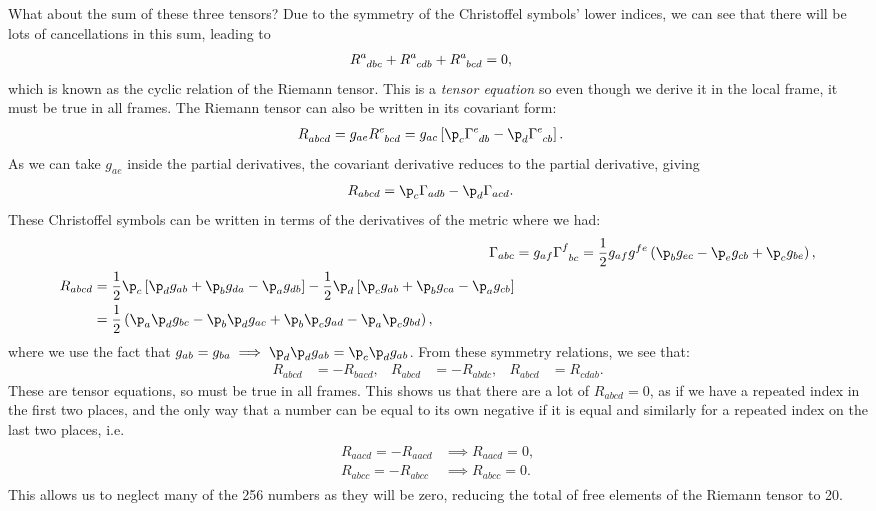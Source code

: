 \documentclass[a4paper, 11pt, normalem]{report}
\begin{document}
What about the sum of these three tensors?
Due to the symmetry of the Christoffel symbols' lower indices, we can see that there will be lots of cancellations in this sum, leading to
\begin{align}
    \tensor{R}{^a_{dbc}} + \tensor{R}{^a_{cdb}} + \tensor{R}{^a_{bcd}} &= 0,
\end{align}
which is known as the cyclic relation of the Riemann tensor.
This is a \emph{tensor equation} so even though we derive it in the local frame, it must be true in all frames. 
The Riemann tensor can also be written in its covariant form:
\begin{align}
    \tensor{R}{_{abcd}} &= g_{ae}\tensor{R}{^e_{bcd}} = g_{ac}\left[\p_c\tensor{\Gamma}{^e_{db}} - \p_d\tensor{\Gamma}{^e_{cb}}\right].
\end{align}
As we can take $g_{ae}$ inside the partial derivatives, the covariant derivative reduces to the partial derivative, giving
\begin{align}
    R_{abcd} &= \p_c\Gamma_{adb}-\p_d\Gamma_{acd}.
\end{align}
These Christoffel symbols can be written in terms of the derivatives of the metric where we had:
\begin{align}
    \Gamma_{abc} &= g_{af}\tensor{\Gamma}{^f_{bc}} = \frac12 g_{af}g^{fe}\left(\p_bg_{ec} - \p_eg_{cb} + \p_cg_{be}\right),\\
    \begin{split}
        R_{abcd} &= \frac12\p_c\left[\p_dg_{ab} + \p_bg_{da} - \p_ag_{db}\right] - \frac12\p_d\left[\p_cg_{ab} + \p_bg_{ca} - \p_ag_{cb}\right] \\
                 &= \frac12\left(\p_a\p_dg_{bc} - \p_b\p_dg_{ac} + \p_b\p_cg_{ad} - \p_a\p_cg_{bd}\right),
    \end{split}
\end{align}
where we use the fact that $g_{ab}=g_{ba} \implies \p_d\p_dg_{ab} = \p_c\p_dg_{ab}$.
From these symmetry relations, we see that:
\begin{align}
    R_{abcd} &= -R_{bacd}, & R_{abcd} &= -R_{abdc}, & R_{abcd} &= R_{cdab}.
\end{align}
These are tensor equations, so must be true in all frames. 
This shows us that there are a lot of $R_{abcd}=0$, as if we have a repeated index in the first two places, and the only way that a number can be equal to its own negative if it is equal and similarly for a repeated index on the last two places, i.e.
\begin{align}
    \begin{split}
        R_{aacd} = -R_{aacd} &\implies R_{aacd} = 0, \\
        R_{abcc} = -R_{abcc} &\implies R_{abcc} = 0.
    \end{split}
\end{align}
This allows us to neglect many of the 256 numbers as they will be zero, reducing the total of free elements of the Riemann tensor to 20.
\end{document}

